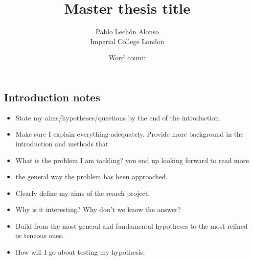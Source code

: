 \documentclass[titlepage,11pt]{article}
\newcommand{\wordcount}{} %
\begin{document}
	
	\title{\textbf{Master thesis title} }
	\author{Pablo Lechón Alonso \\ [30pt]
		Imperial College London}
	\date{Word count: \wordcount}%
	\maketitle
	
	
	\begin{abstract}
	
	\end{abstract}
	
	\tableofcontents
	\newpage
	
	\begin{linenumbers}
		\section{Introduction notes} 
			\begin{itemize}
				\item State my aims/hypotheses/questions by the end of the introduction.
				\item Make sure I explain everything adequately. Provide more background in the introduction and methods that
				\item What is the problem I am tackling? you end up looking forward to read more
				\item the general way the problem has been approached.
				\item Clearly define my aims of the rearch project.
				\item Why is it interesting? Why don't we know the answer?
				\item Build from the most general and fundamental hypotheses to the most refined or teneous ones.
				\item How will I go about testing my hypothesis.
				

\end{itemize}
\end{linenumbers}
\end{document}
